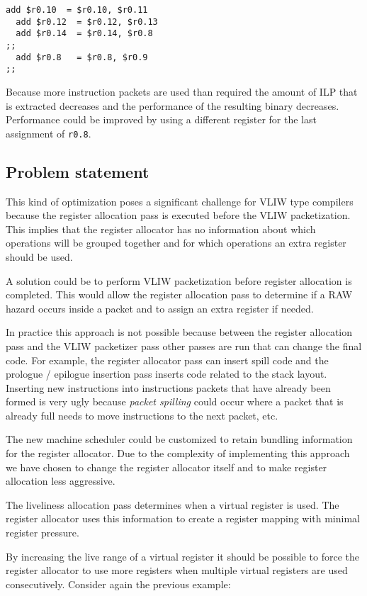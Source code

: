 \begin{lstlisting}[language=rvex]
  add $r0.10  = $r0.10, $r0.11
  add $r0.12  = $r0.12, $r0.13
  add $r0.14  = $r0.14, $r0.8
;;
  add $r0.8   = $r0.8, $r0.9
;;
\end{lstlisting}

Because more instruction packets are used than required the amount of ILP that is extracted decreases and the performance of the resulting binary decreases. Performance could be improved by using a different register for the last assignment of \texttt{r0.8}. 

\subsection{Problem statement}
This kind of optimization poses a significant challenge for VLIW type compilers because the register allocation pass is executed before the VLIW packetization. This implies that the register allocator has no information about which operations will be grouped together and for which operations an extra register should be used.

A solution could be to perform VLIW packetization before register allocation is completed. This would allow the register allocation pass to determine if a RAW hazard occurs inside a packet and to assign an extra register if needed.

In practice this approach is not possible because between the register allocation pass and the VLIW packetizer pass other passes are run that can change the final code. For example, the register allocator pass can insert spill code and the prologue / epilogue insertion pass inserts code related to the stack layout. Inserting new instructions into instructions packets that have already been formed is very ugly because \emph{packet spilling} could occur where a packet that is already full needs to move instructions to the next packet, etc. 

The new machine scheduler could be customized to retain bundling information for the register allocator. Due to the complexity of implementing this approach we have chosen to change the register allocator itself and to make register allocation less aggressive. 

The liveliness allocation pass determines when a virtual register is used. The register allocator uses this information to create a register mapping with minimal register pressure.

By increasing the live range of a virtual register it should be possible to force the register allocator to use more registers when multiple virtual registers are used consecutively. Consider again the previous example:

